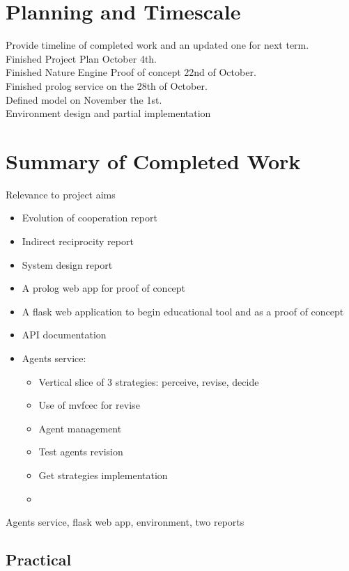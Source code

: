 \documentclass[]{final_report}
\begin{document}
\chapter{Planning and Timescale}
Provide timeline of completed work and an updated one for next term.\\
Finished Project Plan October 4th.\\
Finished Nature Engine Proof of concept 22nd of October.\\
Finished prolog service on the 28th of October.\\
Defined model on November the 1st.\\
Environment design and partial implementation\\
\begin{framed}

\end{framed}



\chapter{Summary of Completed Work}
Relevance to project aims
\begin{itemize}
	\item Evolution of cooperation report
	\item Indirect reciprocity report
	\item System design report
	\item A prolog web app for proof of concept
	\item A flask web application to begin educational tool and as a proof of concept
	\item API documentation
	\item Agents service:
	\begin{itemize}
		\item Vertical slice of 3 strategies: perceive, revise, decide
		\item Use of mvfcec for revise
		\item Agent management
		\item Test agents revision
		\item Get strategies implementation
		\item 
	\end{itemize}
\end{itemize}
Agents service, flask web app, environment, two reports

\section{Practical}
\end{document}
